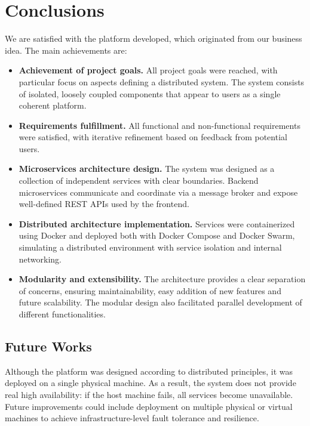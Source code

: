 \section{Conclusions}

We are satisfied with the platform developed, which originated from our business idea. The main achievements are:

\begin{itemize}
  \item \textbf{Achievement of project goals.} All project goals were reached, with particular focus on aspects defining a distributed system. The system consists of isolated, loosely coupled components that appear to users as a single coherent platform.

  \item \textbf{Requirements fulfillment.} All functional and non-functional requirements were satisfied, with iterative refinement based on feedback from potential users.

  \item \textbf{Microservices architecture design.} The system was designed as a collection of independent services with clear boundaries. Backend microservices communicate and coordinate via a message broker and expose well-defined REST APIs used by the frontend.

  \item \textbf{Distributed architecture implementation.} Services were containerized using Docker and deployed both with Docker Compose and Docker Swarm, simulating a distributed environment with service isolation and internal networking.

  \item \textbf{Modularity and extensibility.} The architecture provides a clear separation of concerns, ensuring maintainability, easy addition of new features and future scalability. The modular design also facilitated parallel development of different functionalities.
\end{itemize}

\subsection{Future Works}

Although the platform was designed according to distributed principles, it was deployed on a single physical machine. As a result, the system does not provide real high availability: if the host machine fails, all services become unavailable. Future improvements could include deployment on multiple physical or virtual machines to achieve infrastructure-level fault tolerance and resilience.

